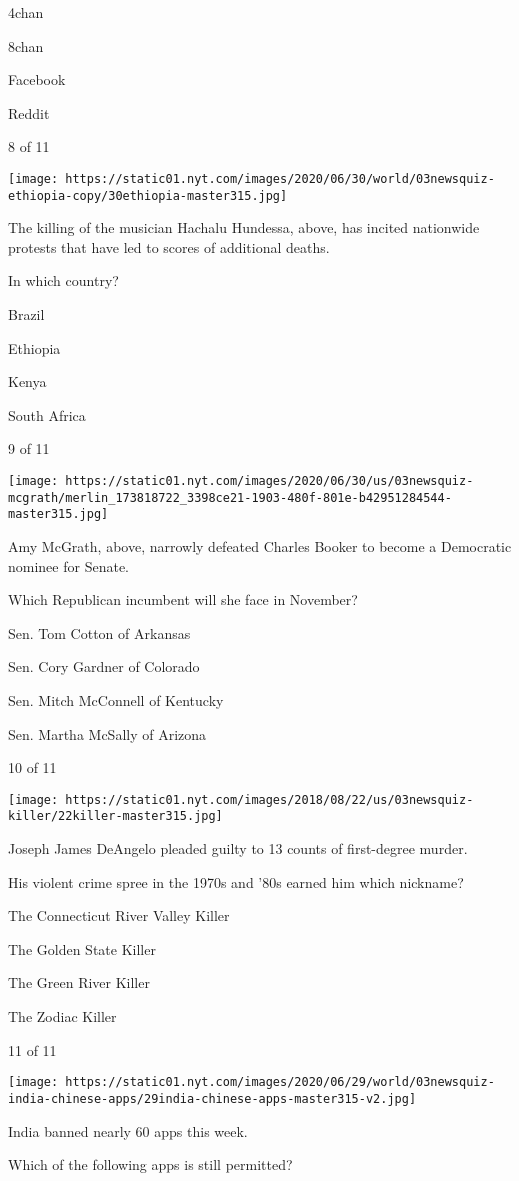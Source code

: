 4chan

8chan

Facebook

Reddit

8 of 11

\texttt{[image: https://static01.nyt.com/images/2020/06/30/world/03newsquiz-ethiopia-copy/30ethiopia-master315.jpg]}

The killing of the musician Hachalu Hundessa, above, has incited
nationwide protests that have led to scores of additional deaths.

In which country?

Brazil

Ethiopia

Kenya

South Africa

9 of 11

\texttt{[image: https://static01.nyt.com/images/2020/06/30/us/03newsquiz-mcgrath/merlin\_173818722\_3398ce21-1903-480f-801e-b42951284544-master315.jpg]}

Amy McGrath, above, narrowly defeated Charles Booker to become a
Democratic nominee for Senate.

Which Republican incumbent will she face in November?

Sen. Tom Cotton of Arkansas

Sen. Cory Gardner of Colorado

Sen. Mitch McConnell of Kentucky

Sen. Martha McSally of Arizona

10 of 11

\texttt{[image: https://static01.nyt.com/images/2018/08/22/us/03newsquiz-killer/22killer-master315.jpg]}

Joseph James DeAngelo pleaded guilty to 13 counts of first-degree
murder.

His violent crime spree in the 1970s and '80s earned him which nickname?

The Connecticut River Valley Killer

The Golden State Killer

The Green River Killer

The Zodiac Killer

11 of 11

\texttt{[image: https://static01.nyt.com/images/2020/06/29/world/03newsquiz-india-chinese-apps/29india-chinese-apps-master315-v2.jpg]}

India banned nearly 60 apps this week.

Which of the following apps is still permitted?

